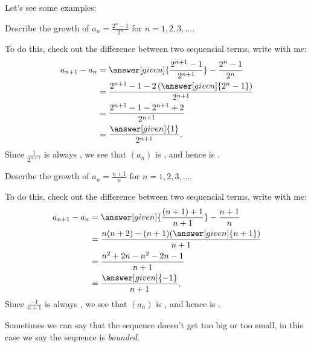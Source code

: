 \documentclass{ximera}
\begin{document}
Let's see some examples:
\begin{example}
  Describe the growth of $a_n = \frac{2^n-1}{2^n}$ for
  $n=1,2,3,\dots$.
  \begin{explanation}
    To do this, check out the difference between two sequencial terms,
    write with me:
    \begin{align*}
    a_{n+1} - a_n &= \answer[given]{\frac{2^{n+1}-1}{2^{n+1}}} - \frac{2^n-1}{2^n}\\
    &=\frac{2^{n+1}-1 - 2\left(\answer[given]{2^n-1}\right)}{2^{n+1}}\\
    &=\frac{2^{n+1}-1 - 2^{n+1}+2}{2^{n+1}}\\
    &=\frac{\answer[given]{1}}{2^{n+1}}.
    \end{align*}
    Since $\frac{1}{2^{n+1}}$ is always
    ,
    we see that $(a_n)$ is
    , and hence is .
  \end{explanation}
\end{example}

\begin{example}
  Describe the growth of $a_n = \frac{n+1}{n}$ for $n=1,2,3,\dots$.
  \begin{explanation}
    To do this, check out the difference between two sequencial terms,
    write with me:
    \begin{align*}
    a_{n+1} - a_n &= \answer[given]{\frac{(n+1)+1}{n+1}} - \frac{n+1}{n}\\
    &=\frac{n(n+2) - (n+1)(\answer[given]{n+1})}{n+1}\\
    &=\frac{n^2+2n - n^2 -2n-1}{n+1}\\
    &=\frac{\answer[given]{-1}}{n+1}.
    \end{align*}
    Since $\frac{-1}{n+1}$ is always
    ,
    we see that $(a_n)$ is
    , and hence is .
  \end{explanation}
\end{example}

Sometimes we can say that the sequence doesn't get too big or too
small, in this case we say the sequence is \textit{bounded}.
\end{document}
